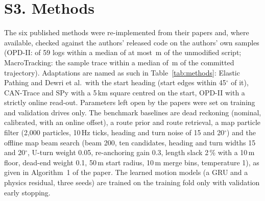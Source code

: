 \documentclass[conference]{IEEEtran}
\begin{document}
\section{S3. Methods}\label{sec:methods}
The six published methods were re-implemented from their papers and, where available, checked against the authors'
released code on the authors' own samples (OPD-II: \OpdSampleLogs{} of 59 logs within a median of at most
\OpdSampleMaxMedian{}\,m of the unmodified script; MacroTracking: the sample trace within a median of
\MacroSampleMedian{}\,m of the committed trajectory). Adaptations are named as such in Table~\ref{tab:methods}: Elastic
Pathing and Dewri et al.\ with the start heading (start edges within 45$^\circ$ of it), CAN-Trace and SPy with a 5\,km
square centred on the start, OPD-II with a strictly online read-out. Parameters left open by the papers were set on
training and validation drives only. The benchmark baselines are dead reckoning (nominal, calibrated, with an online
offset), a route prior and route retrieval, a map particle filter (2{,}000 particles, 10\,Hz ticks, heading and turn
noise of 15 and 20$^\circ$) and the offline map beam search (beam 200, ten candidates, heading and turn widths 15 and
20$^\circ$, U-turn weight 0.05, re-anchoring gain 0.3, length slack 2\,\% with a 10\,m floor, dead-end weight 0.1,
50\,m start radius, 10\,m merge bins, temperature 1), as given in Algorithm~1 of the paper. The learned motion models
(a GRU and a physics residual, three seeds) are trained on the training fold only with validation early stopping.

\onecolumn
\raggedbottom
\renewenvironment{table*}[1][]{\begin{table}[H]}{\end{table}}
\renewenvironment{figure*}[1][]{\begin{figure}[H]}{\end{figure}}
\end{document}
